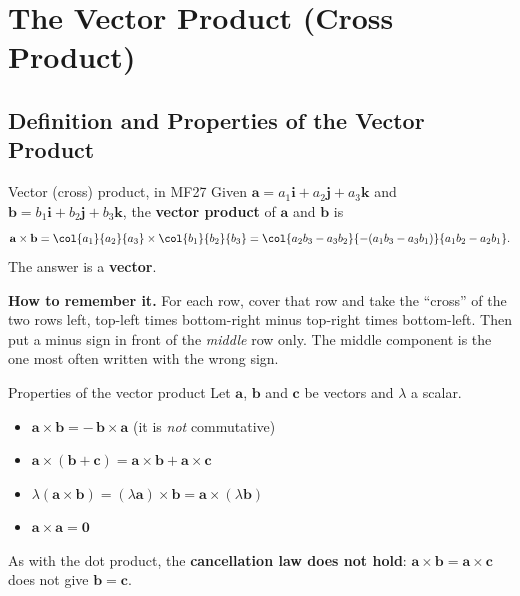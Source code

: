 \clearpage
\section{The Vector Product (Cross Product)}
\subsection{Definition and Properties of the Vector Product}
\begin{definition}{{Vector (cross) product, in MF27}}
Given $\mathbf{a} = a_1\mathbf{i} + a_2\mathbf{j} + a_3\mathbf{k}$ and $\mathbf{b} = b_1\mathbf{i} + b_2\mathbf{j} + b_3\mathbf{k}$, the \textbf{vector product} of $\mathbf{a}$ and $\mathbf{b}$ is
\[
\mathbf{a}\times\mathbf{b} = \col{a_1}{a_2}{a_3}\times\col{b_1}{b_2}{b_3}
  = \col{a_2 b_3 - a_3 b_2}{-(a_1 b_3 - a_3 b_1)}{a_1 b_2 - a_2 b_1}.
\]
The answer is a \textbf{vector}.
\end{definition}
\textbf{How to remember it.} For each row, cover that row and take the ``cross'' of the two rows left, top-left times bottom-right minus top-right times bottom-left. Then put a minus sign in front of the \emph{middle} row only. The middle component is the one most often written with the wrong sign.

\begin{definition}{Properties of the vector product}
Let $\mathbf{a}$, $\mathbf{b}$ and $\mathbf{c}$ be vectors and $\lambda$ a scalar.
\begin{itemize}
  \item $\mathbf{a}\times\mathbf{b} = -\,\mathbf{b}\times\mathbf{a}$ \quad (it is \emph{not} commutative)
  \item $\mathbf{a}\times(\mathbf{b}+\mathbf{c}) = \mathbf{a}\times\mathbf{b} + \mathbf{a}\times\mathbf{c}$
  \item $\lambda(\mathbf{a}\times\mathbf{b}) = (\lambda\mathbf{a})\times\mathbf{b} = \mathbf{a}\times(\lambda\mathbf{b})$
  \item $\mathbf{a}\times\mathbf{a} = \mathbf{0}$
\end{itemize}
As with the dot product, the \textbf{cancellation law does not hold}: $\mathbf{a}\times\mathbf{b} = \mathbf{a}\times\mathbf{c}$ does not give $\mathbf{b} = \mathbf{c}$.
\end{definition}

